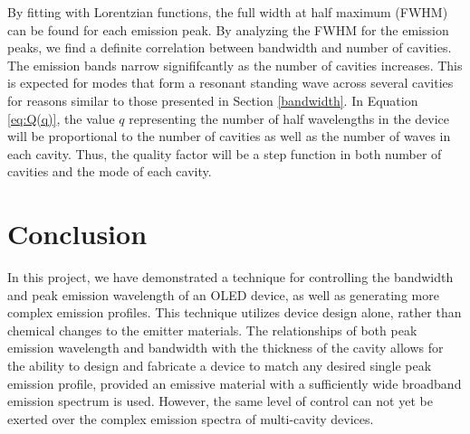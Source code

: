 \documentclass{report}
\begin{document}
        By fitting with Lorentzian functions, the full width at half maximum (FWHM) can be found for each emission peak. By analyzing the FWHM for the emission peaks, we find a definite correlation between bandwidth and number of cavities. The emission bands narrow signififcantly as the number of cavities increases. This is expected for modes that form a resonant standing wave across several cavities for reasons similar to those presented in Section \ref{bandwidth}. In Equation \ref{eq:Q(q)}, the value $q$ representing the number of half wavelengths in the device will be proportional to the number of cavities as well as the number of waves in each cavity. Thus, the quality factor will be a step function in both number of cavities and the mode of each cavity.
% 


\chapter{Conclusion} \label{concl}

    In this project, we have demonstrated a technique for controlling the bandwidth and peak emission wavelength of an OLED device, as well as generating more complex emission profiles. This technique utilizes device design alone, rather than chemical changes to the emitter materials. The relationships of both peak emission wavelength and bandwidth with the thickness of the cavity allows for the ability to design and fabricate a device to match any desired single peak emission profile, provided  an emissive material with a sufficiently wide broadband emission spectrum is used. However, the same level of control can not yet be exerted over the complex emission spectra of multi-cavity devices.
    
\end{document}
